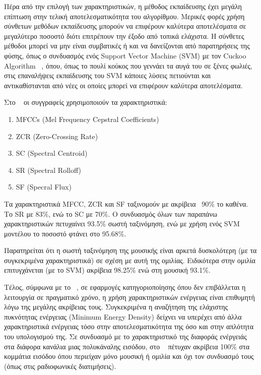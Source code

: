 \vspace{1em}
Πέρα από την επιλογή των χαρακτηριστικών, η μέθοδος εκπαίδευσης έχει μεγάλη επίπτωση στην
τελική αποτελεσματικότητα του αλγορίθμου. Μερικές φορές χρήση σύνθετων μεθόδων
εκπαίδευσης μπορούν να επιφέρουν καλύτερα αποτελέσματα σε μεγαλύτερο ποσοστό
διότι επιτρέπουν την έξοδο από τοπικά ελάχιστα. Η σύνθετες μέθοδοι μπορεί να μην
είναι συμβατικές ή και να δανείζονται από παρατηρήσεις της φύσης, όπως ο
συνδυασμός ενός Support Vector Machine (SVM) με τον Cuckoo Algorithm ~\cite{cuckoo},
όπου, όπως το πουλί κούκος που γεννάει τα αυγά του σε ξένες φωλιές, στις
επαναλήψεις εκπαίδευσης του SVM κάποιες λύσεις πετιούνται και αντικαθίστανται από
νέες οι οποίες μπορεί να επιφέρουν καλύτερα αποτελέσματα.

\vspace{1em}
Στο ~\cite{hybrid} οι συγγραφείς χρησιμοποιούν τα χαρακτηριστικά:
\begin{enumerate}[noitemsep]
\item ΜFCCs (Mel Frequency Cepstral Coefficients)
\item ZCR (Zero-Crossing Rate)
\item SC (Spectral Centroid)
\item SR (Spectral Rolloff)
\item SF (Specral Flux)
\end{enumerate}

Τα χαρακτηριστικά ΜFCC, ZCR και SF ταξινομούν με ακρίβεια ~90\% το καθένα. Το SR με 83\%, ενώ το SC με 70\%. Ο συνδυασμός όλων των παραπάνω χαρακτηριστικών πετυχαίνει
93.5\% σωστή ταξινόμηση, ενώ με χρήση ενός SVM μοντέλου το ποσοστό φτάνει στο
95.68\%.

Παρατηρείται ότι η σωστή ταξινόμηση της μουσικής είναι αρκετά δυσκολότερη (με
τα συγκεκριμένα χαρακτηριστικά) σε σχέση με αυτή της ομιλίας. Ειδικότερα στην ομιλία
επιτυγχάνεται (με το SVM) ακρίβεια 98.25\% ενώ στη μουσική 93.1\%.

\vspace{1em}
Τέλος, σύμφωνα με το ~\cite{radio}, σε εφαρμογές κατηγοριοποίησης όπου δεν
επιβάλλεται η λειτουργία σε πραγματικό χρόνο, η χρήση χαρακτηριστικών ενέργειας είναι
επιθυμητή λόγω της μεγάλης ακρίβειας τους. Συγκεκριμένα η αναζήτηση της ελάχιστης πυκνότητας ενέργειας (Minimum
Energy Density) δείχνει να υπερέχει από άλλα χαρακτηριστικά ενέργειας τόσο στην
αποτελεσματικότητα της όσο και στην απλότητα του υπολογισμού της. Σε συνδυασμό με το
χαρακτηριστικό της διαφοράς ενέργειάς στα διάφορα κανάλια μιας πολυκάναλης
εισόδου, στο ~\cite{radio} πέτυχαν ακρίβεια 100\% στα κομμάτια εισόδου όπου
περιείχαν μόνο μουσική ή ομιλία και όχι τον συνδυασμό τους (όπως στις ραδιοφωνικές
διατιμήσεις).
